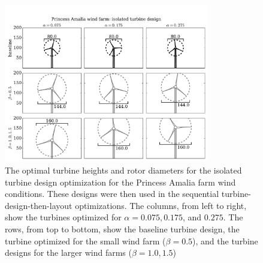 \begin{figure}[htbp]
  \centering
  \includegraphics[width=0.8\textwidth]{Figures/turbineSizesAmalia_sequential.pdf}
  \caption{\label{amalia_turbines_seq} The optimal turbine heights and rotor diameters for the isolated turbine design optimization for the Princess Amalia farm wind conditions. These designs were then used in the sequential turbine-design-then-layout optimizations. The columns, from left to right, show the turbines optimized for $\alpha=0.075,0.175$, and $0.275$. The rows, from top to bottom, show the baseline turbine design, the turbine optimized for the small wind farm ($\beta=0.5$), and the turbine designs for the larger wind farms ($\beta=1.0,1.5$)}
\end{figure}





